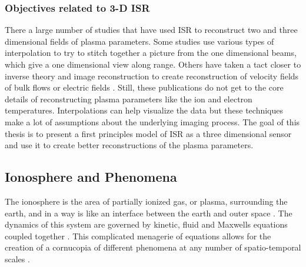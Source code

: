\subsubsection{Objectives related to 3-D ISR}
There a large number of studies that have used ISR to reconstruct two and three dimensional fields of plasma parameters. Some studies use various types of interpolation to try to stitch together a picture from the one dimensional beams, which give a one dimensional view along range\cite{Semeter2009738,Butler:2013ul,Semeter:2005fo}. Others have taken a tact closer to inverse theory and image reconstruction to create reconstruction of velocity fields of bulk flows or electric fields \cite{butler:imagingfregiondrifts,RDS:RDS20195}. Still, these publications do not get to the core details of reconstructing plasma parameters like the ion and electron temperatures. Interpolations can help visualize the data but these techniques make a lot of assumptions about the underlying imaging process. The goal of this thesis is to present a first principles model of ISR as a three dimensional sensor and use it to create better reconstructions of the plasma parameters.

\subsection{Ionosphere and Phenomena}
The ionosphere is the area of partially ionized gas, or plasma, surrounding the earth, and in a way is like an interface between the earth and outer space \cite{kellybook}. The dynamics of this system are governed by kinetic, fluid and Maxwells equations coupled together \cite{schunk2004ionospheres}. This complicated menagerie of equations allows for the creation of a cornucopia of different phenomena at any number of spatio-temporal scales \cite{Semeter:2008hs,Semeter2009738}.


